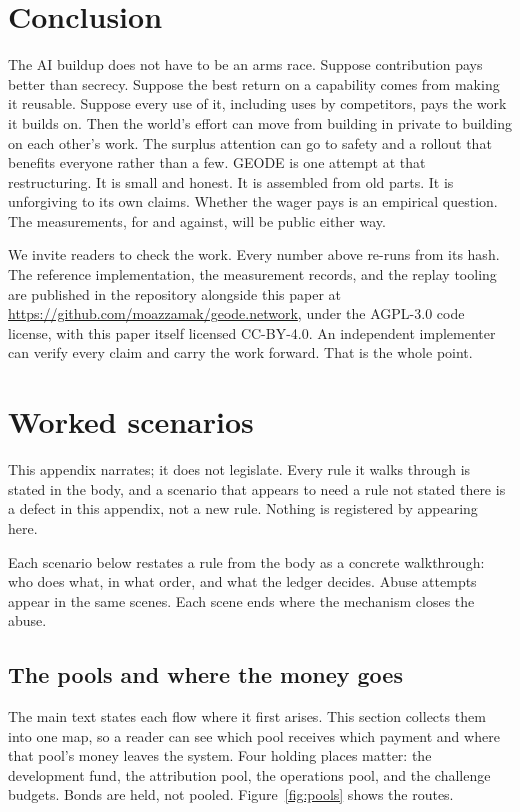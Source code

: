 \documentclass[11pt]{article}
\begin{document}
\section{Conclusion}

The AI buildup does not have to be an arms race. Suppose
contribution pays better than secrecy. Suppose the best return on
a capability comes from making it reusable. Suppose every use of
it, including uses by competitors, pays the work it builds on.
Then the world's effort can move from building in private to
building on each other's work. The surplus attention can go to
safety and a rollout that benefits everyone rather than a few.
GEODE is one attempt at that restructuring. It is small and
honest. It is assembled from old parts. It is unforgiving to its
own claims. Whether the wager pays is an empirical question. The
measurements, for and against, will be public either way.

We invite readers to check the work. Every number above re-runs
from its hash. The reference implementation, the measurement
records, and the replay tooling are published in the repository
alongside this paper at
\url{https://github.com/moazzamak/geode.network}, under the
AGPL-3.0 code license, with this paper itself licensed CC-BY-4.0.
An
independent implementer can verify every claim and carry the work
forward. That is the whole point.

\appendix
\section{Worked scenarios}\label{app:scenarios}

This appendix narrates; it does not legislate. Every rule it walks
through is stated in the body, and a scenario that appears to need
a rule not stated there is a defect in this appendix, not a new
rule. Nothing is registered by appearing here.

Each scenario below restates a rule from the body as a concrete
walkthrough: who does what, in what order, and what the ledger
decides. Abuse attempts appear in the same scenes. Each scene
ends where the mechanism closes the abuse.

\subsection{The pools and where the money goes}

The main text states each flow where it first arises. This
section collects them into one map, so a reader can see which
pool receives which payment and where that pool's money leaves
the system. Four
holding places matter: the development fund, the attribution
pool, the operations pool, and the challenge budgets. Bonds are
held, not pooled. Figure~\ref{fig:pools} shows the routes.
\end{document}
